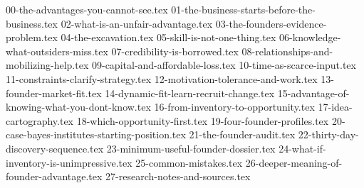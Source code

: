 
{00-the-advantages-you-cannot-see.tex}
{01-the-business-starts-before-the-business.tex}
{02-what-is-an-unfair-advantage.tex}
{03-the-founders-evidence-problem.tex}
{04-the-excavation.tex}
{05-skill-is-not-one-thing.tex}
{06-knowledge-what-outsiders-miss.tex}
{07-credibility-is-borrowed.tex}
{08-relationships-and-mobilizing-help.tex}
{09-capital-and-affordable-loss.tex}
{10-time-as-scarce-input.tex}
{11-constraints-clarify-strategy.tex}
{12-motivation-tolerance-and-work.tex}
{13-founder-market-fit.tex}
{14-dynamic-fit-learn-recruit-change.tex}
{15-advantage-of-knowing-what-you-dont-know.tex}
{16-from-inventory-to-opportunity.tex}
{17-idea-cartography.tex}
{18-which-opportunity-first.tex}
{19-four-founder-profiles.tex}
{20-case-bayes-institutes-starting-position.tex}
{21-the-founder-audit.tex}
{22-thirty-day-discovery-sequence.tex}
{23-minimum-useful-founder-dossier.tex}
{24-what-if-inventory-is-unimpressive.tex}
{25-common-mistakes.tex}
{26-deeper-meaning-of-founder-advantage.tex}
{27-research-notes-and-sources.tex}
